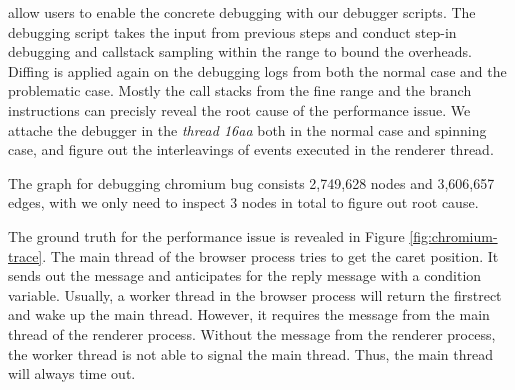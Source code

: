 \xxx allow users to enable the concrete debugging with our debugger scripts.
The debugging script takes the input from previous steps and conduct step-in debugging and callstack sampling
within the range to bound the overheads.
Diffing is applied again on the debugging logs from both the normal case and the problematic case.
Mostly the call stacks from the fine range and the branch instructions can precisly
reveal the root cause of the performance issue.
We attache the debugger in the \textit{thread 16aa} both in the normal case and spinning case,
and figure out the interleavings of events executed in the renderer thread.

The graph for debugging chromium bug consists 2,749,628 nodes and 3,606,657 edges,
with \xxx we only need to inspect 3 nodes in total to figure out root cause.

The ground truth for the performance issue is revealed in Figure \ref{fig:chromium-trace}.
The main thread of the browser process tries to get the caret position.
It sends out the message and anticipates for the reply message with a condition variable.
Usually, a worker thread in the browser process will return the firstrect and wake up the main thread.
However, it requires the message from the main thread of the renderer process.
Without the message from the renderer process, the worker thread is not able to signal the main thread.
Thus, the main thread will always time out.
